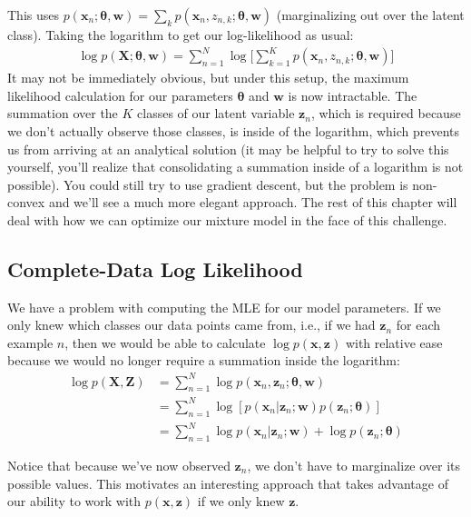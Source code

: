 This uses $p(\textbf{x}_n; \boldsymbol{\theta}, \textbf{w})=\sum_k p(\textbf{x}_n, z_{n,k}; \boldsymbol{\theta}, \textbf{w})$ (marginalizing out over the latent class).
Taking the logarithm to get our log-likelihood as usual:
\begin{align} \label{intractable-log-likelihood}
    \log p(\textbf{X}; \boldsymbol{\theta}, \textbf{w}) = \sum_{n=1}^{N} \log \bigg[ \sum_{k=1}^{K} p(\textbf{x}_{n}, z_{n, k}; \boldsymbol{\theta}, \textbf{w}) \bigg]
\end{align}
It may not be immediately obvious, but under this setup, the maximum likelihood calculation for our parameters $\boldsymbol{\theta}$ and $\textbf{w}$ is now intractable. The summation over the $K$ classes of our latent variable $\textbf{z}_{n}$, which is required because we don't actually observe those classes, is inside of the logarithm, which prevents us from arriving at
an analytical solution (it may be helpful to try to solve this yourself, you'll realize that consolidating a summation inside of a logarithm is not possible). You could still try to use gradient descent, but the problem is non-convex and we'll see a much more elegant approach. The rest of this chapter will deal with how we can optimize our mixture model in the face of this challenge.

\subsection{Complete-Data Log Likelihood}

We have a problem with computing the MLE for our model parameters. If we only knew which classes our data points came from, i.e., if we had $\textbf{z}_n$ for each example $n$, then
we would be able to calculate $\log p(\textbf{x}, \textbf{z})$ with relative ease because we would no longer require a summation inside the logarithm:
%
\begin{align} \label{complete-data-log-likelihood}
    \log p(\textbf{X}, \textbf{Z}) &= \sum_{n=1}^{N} \log p(\textbf{x}_n, \textbf{z}_n; \boldsymbol{\theta}, \textbf{w}) \\
    &= \sum_{n=1}^{N} \log[p(\textbf{x}_n | \textbf{z}_n; \textbf{w}) p(\textbf{z}_n; \boldsymbol{\theta})] \\
    &= \sum_{n=1}^{N} \log p(\textbf{x}_n | \textbf{z}_n; \textbf{w}) + \log p(\textbf{z}_n; \boldsymbol{\theta}) 
\end{align}

Notice that because we've now observed $\textbf{z}_{n}$, we don't have to marginalize over its possible values. This motivates an interesting approach that takes advantage of our ability to work with $p(\textbf{x}, \textbf{z})$ if we only knew $\textbf{z}$.

